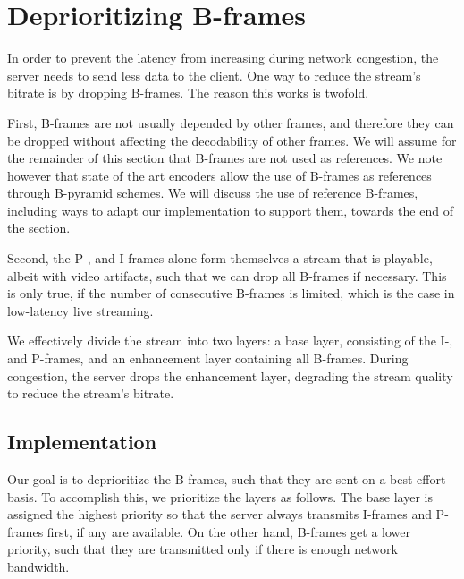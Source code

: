 \chapter{Deprioritizing B-frames}\label{chapter:deprioritizing_b_frames}
In order to prevent the latency from increasing during network congestion, the server needs to send less data to the client. One way to reduce the stream's bitrate is by dropping B-frames. The reason this works is twofold. 

First, B-frames are not usually depended by other frames, and therefore they can be dropped without affecting the decodability of other frames. We will assume for the remainder of this section that B-frames are not used as references. We note however that state of the art encoders allow the use of B-frames as references through B-pyramid schemes. We will discuss the use of reference B-frames, including ways to adapt our implementation to support them, towards the end of the section. %

Second, the P-, and I-frames alone form themselves a stream that is playable, albeit with video artifacts, such that we can drop all B-frames if necessary. This is only true, if the number of consecutive B-frames is limited, which is the case in low-latency live streaming. %

We effectively divide the stream into two layers: a base layer, consisting of the I-, and P-frames, and an enhancement layer containing all B-frames. During congestion, the server drops the enhancement layer, degrading the stream quality to reduce the stream's bitrate.


\section{Implementation}
Our goal is to deprioritize the B-frames, such that they are sent on a best-effort basis. To accomplish this, we prioritize the layers as follows. The base layer is assigned the highest priority so that the server always transmits I-frames and P-frames first, if any are available. On the other hand, B-frames get a lower priority, such that they are transmitted only if there is enough network bandwidth.

